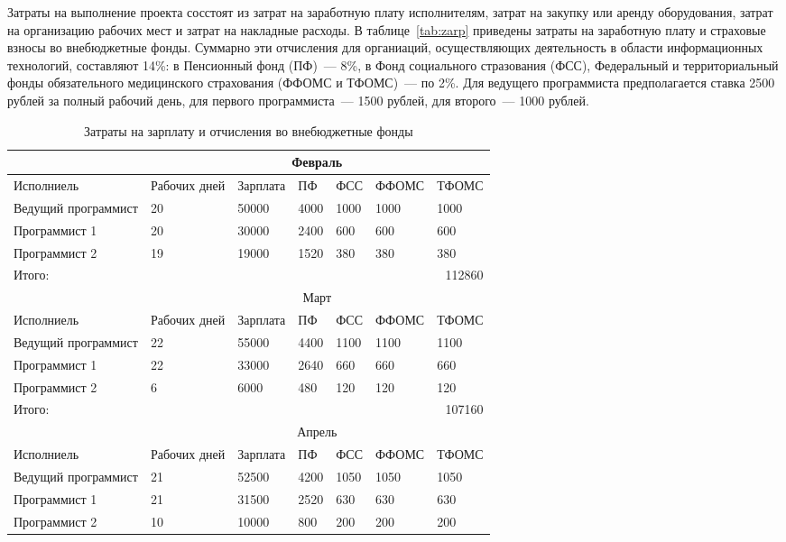 Затраты на выполнение проекта сосстоят из затрат на заработную плату исполнителям, затрат на закупку или аренду оборудования, затрат на организацию рабочих мест и затрат на накладные расходы. В таблице~\ref{tab:zarp} приведены затраты на заработную плату и страховые взносы во внебюджетные фонды. Суммарно эти отчисления для органиаций, осуществляющих деятельность в области информационных технологий, составляют 14\%: в Пенсионный фонд (ПФ)~--- 8\%, в Фонд социального стразования (ФСС), Федеральный и территориальный фонды обязательного медицинского страхования (ФФОМС и ТФОМС)~--- по 2\%. Для ведущего программиста предполагается ставка 2500 рублей за полный рабочий день, для первого программиста~--- 1500 рублей, для второго~--- 1000 рублей. 

\begin{table}[ht!]\footnotesize
\caption{Затраты на зарплату и отчисления во внебюджетные фонды}
\begin{tabular}{|l|l|l|l|l|l|l|}
\hline
& \multicolumn{6}{c|}{Февраль}\\
\hline
Исполниель & Рабочих дней & Зарплата & ПФ & ФСС & ФФОМС & ТФОМС\\
\hline
Ведущий программист & 20 & 50000 & 4000 & 1000 & 1000 & 1000\\
\hline
Программист 1 & 20 & 30000 & 2400 & 600 & 600 & 600\\
\hline
Программист 2 & 19 & 19000 & 1520 & 380 & 380 & 380\\
\hline
Итого: & \multicolumn{6}{r|}{112860}\\
\hline
& \multicolumn{6}{c|}{Март}\\
\hline
Исполниель & Рабочих дней & Зарплата & ПФ & ФСС & ФФОМС & ТФОМС\\
\hline
Ведущий программист & 22 & 55000 & 4400 & 1100 & 1100 & 1100\\
\hline
Программист 1 & 22 & 33000 & 2640 & 660 & 660 & 660\\
\hline
Программист 2 & 6 & 6000 & 480 & 120 & 120 & 120\\
\hline
Итого: & \multicolumn{6}{r|}{107160}\\
\hline
& \multicolumn{6}{c|}{Апрель}\\
\hline
Исполниель & Рабочих дней & Зарплата & ПФ & ФСС & ФФОМС & ТФОМС\\
\hline
Ведущий программист & 21 & 52500 & 4200 & 1050 & 1050 & 1050\\
\hline
Программист 1 & 21 & 31500 & 2520 & 630 & 630 & 630\\
\hline
Программист 2 & 10 & 10000 & 800 & 200 & 200 & 200\\

\end{tabular}
\end{table}

